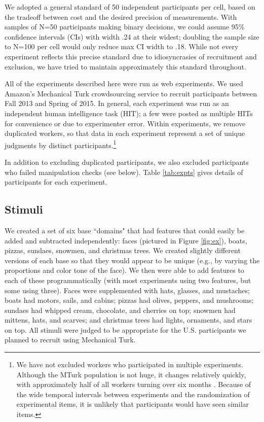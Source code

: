 \documentclass[man,noapacite]{apa2}
\begin{document}
We adopted a general standard of 50 independent participants per cell, based on the tradeoff between cost and the desired precision of measurements. With samples of N=50 participants making binary decisions, we could assume 95\% confidence intervals (CIs) with width .24 at their widest; doubling the sample size to N=100 per cell would only reduce max CI width to .18. While not every experiment reflects this precise standard due to idiosyncrasies of recruitment and exclusion, we have tried to maintain approximately this standard throughout.

All of the experiments described here were run as web experiments. We used Amazon's Mechanical Turk crowdsourcing service to recruit participants between Fall 2013 and Spring of 2015. In general, each experiment was run as an independent human intelligence task (HIT); a few were posted as multiple HITs for convenience or due to experimenter error. Within experiments, we remove duplicated workers, so that data in each experiment represent a set of unique judgments by distinct participants.\footnote{We have not excluded workers who participated in multiple experiments. Although the MTurk population is not huge, it changes relatively quickly, with approximately half of all workers turning over six months \cite{stewart2015}. Because of the wide temporal intervals between experiments and the randomization of experimental items, it is unlikely that participants would have seen similar items.}

In addition to excluding duplicated participants, we also excluded participants who failed manipulation checks (see below). Table \ref{tab:expts} gives details of participants for each experiment.

\subsection{Stimuli}

We created a set of six base ``domains" that had features that could easily be added and subtracted independently: faces (pictured in Figure \ref{fig:ex}), boats, pizzas, sundaes, snowmen, and christmas trees. We created slightly different versions of each base so that they would appear to be unique (e.g., by varying the proportions and color tone of the face). We then were able to add features to each of these programmatically (with most experiments using two features, but some using three). Faces were supplemented with hats, glasses, and mustaches; boats had motors, sails, and cabins; pizzas had olives, peppers, and mushrooms; sundaes had whipped cream, chocolate, and cherries on top; snowmen had mittens, hats, and scarves; and christmas trees had lights, ornaments, and stars on top. All stimuli were judged to be appropriate for the U.S. participants we planned to recruit using Mechanical Turk.
\end{document}

